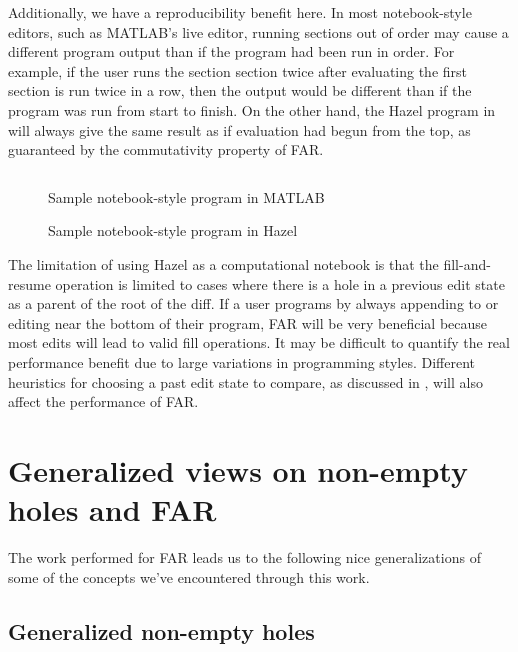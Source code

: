 Additionally, we have a reproducibility benefit here. In most notebook-style editors, such as MATLAB's live editor, running sections out of order may cause a different program output than if the program had been run in order. For example, if the user runs the section section twice after evaluating the first section  is run twice in a row, then the output would be different than if the program was run from start to finish. On the other hand, the Hazel program in  will always give the same result as if evaluation had begun from the top, as guaranteed by the commutativity property of FAR.

\begin{figure}
  \centering
  \inputminted{matlab}{lstings/matlab_notebook_example.m}
  \caption{Sample notebook-style program in MATLAB}
  \label{fig:matlab-notebook-example}
\end{figure}

\begin{figure}
  \centering
  \caption{Sample notebook-style program in Hazel}
  \label{fig:hazel-notebook-example}
\end{figure}

The limitation of using Hazel as a computational notebook is that the fill-and-resume operation is limited to cases where there is a hole in a previous edit state as a parent of the root of the diff. If a user programs by always appending to or editing near the bottom of their program, FAR will be very beneficial because most edits will lead to valid fill operations. It may be difficult to quantify the real performance benefit due to large variations in programming styles. Different heuristics for choosing a past edit state to compare, as discussed in , will also affect the performance of FAR.

\section{Generalized views on non-empty holes and FAR}
\label{sec:generalized-holes-far}

The work performed for FAR leads us to the following nice generalizations of some of the concepts we've encountered through this work.

\subsection{Generalized non-empty holes}
\label{sec:generalized-neholes}

